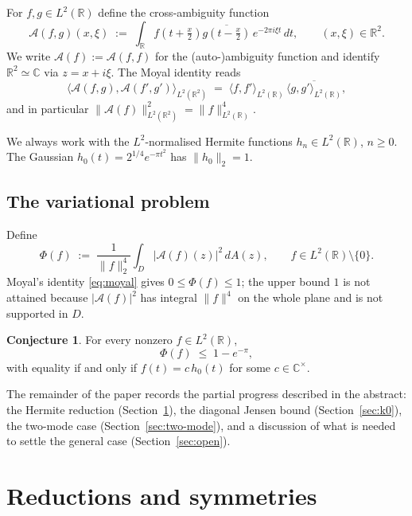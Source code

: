 \documentclass[11pt]{article}
\theoremstyle{definition}
\newtheorem{conjecture}[theorem]{Conjecture}
\newcommand{\C}{\mathbb{C}}
\newcommand{\R}{\mathbb{R}}
\newcommand{\Amb}{\mathcal{A}}
\newcommand{\norm}[1]{\lVert#1\rVert}
\newcommand{\inner}[2]{\langle#1,#2\rangle}
\begin{document}
For $f,g\in L^{2}(\R)$ define the cross-ambiguity function
\begin{equation}\label{eq:amb-def}
   \Amb(f,g)(x,\xi)
   \;:=\; \int_{\R} f\!\left(t+\tfrac{x}{2}\right)\overline{g\!\left(t-\tfrac{x}{2}\right)}\,
                  e^{-2\pi i\xi t}\,dt,
   \qquad (x,\xi)\in\R^{2}.
\end{equation}
We write $\Amb(f):=\Amb(f,f)$ for the (auto-)ambiguity function and identify
$\R^{2}\simeq\C$ via $z=x+i\xi$.  The Moyal identity reads
\begin{equation}\label{eq:moyal}
  \inner{\Amb(f,g)}{\Amb(f',g')}_{L^{2}(\R^{2})}
  \;=\; \inner{f}{f'}_{L^{2}(\R)}\,\overline{\inner{g}{g'}_{L^{2}(\R)}},
\end{equation}
and in particular $\norm{\Amb(f)}_{L^{2}(\R^{2})}^{2}=\norm{f}_{L^{2}(\R)}^{4}$.

We always work with the $L^{2}$-normalised Hermite functions $h_{n}\in L^{2}(\R)$,
$n\ge 0$.  The Gaussian $h_{0}(t)=2^{1/4}e^{-\pi t^{2}}$ has $\norm{h_{0}}_{2}=1$.

\subsection{The variational problem}

Define
\begin{equation}\label{eq:Phi}
   \Phi(f) \;:=\; \frac{1}{\norm{f}_{2}^{4}}\int_{D}|\Amb(f)(z)|^{2}\,dA(z),
   \qquad f\in L^{2}(\R)\setminus\{0\}.
\end{equation}
Moyal's identity \eqref{eq:moyal} gives $0\le \Phi(f)\le 1$; the upper
bound $1$ is not attained because $|\Amb(f)|^{2}$ has integral $\norm{f}^{4}$ on
the whole plane and is not supported in $D$.

\begin{conjecture}\label{thm:main}
For every nonzero $f\in L^{2}(\R)$,
\[
   \Phi(f)\;\le\; 1-e^{-\pi},
\]
with equality if and only if $f(t)=c\,h_{0}(t)$ for some $c\in\C^{\times}$.
\end{conjecture}

The remainder of the paper records the partial progress described in the
abstract: the Hermite reduction
\textup{(}Section~\ref{sec:symm}\textup{)}, the diagonal Jensen bound
\textup{(}Section~\ref{sec:k0}\textup{)}, the two-mode case
\textup{(}Section~\ref{sec:two-mode}\textup{)}, and a discussion of what is
needed to settle the general case
\textup{(}Section~\ref{sec:open}\textup{)}.

\section{Reductions and symmetries}\label{sec:symm}
\end{document}
